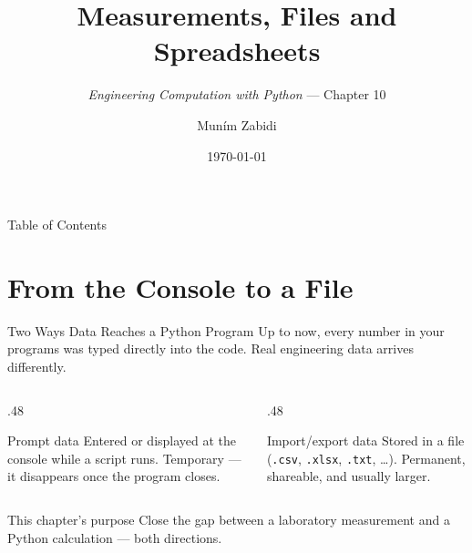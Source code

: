 \documentclass[9pt,aspectratio=169,xcolor=table]{beamer}
\title{Measurements, Files and Spreadsheets}
\subtitle{\emph{Engineering Computation with Python} --- Chapter 10}
\author{Mun\'{i}m Zabidi}
\institute{\color{primary}Faculty of Electrical Engineering, Universiti Teknologi Malaysia}
\date{\today}
\begin{document}
\titlepage

\begin{frame}{Table of Contents}
    \tableofcontents
\end{frame}

\section{From the Console to a File}

\begin{frame}{Two Ways Data Reaches a Python Program}
    \leavevmode
    Up to now, every number in your programs was typed directly into the
    code. Real engineering data arrives differently.

    \vspace{3mm}
    \begin{columns}[t]
        \begin{column}{.48\textwidth}
            \begin{block}{Prompt data}
                \small Entered or displayed at the console while a
                script runs. Temporary --- it disappears once the
                program closes.
            \end{block}
        \end{column}
        \begin{column}{.48\textwidth}
            \begin{block}{Import/export data}
                \small Stored in a file (\texttt{.csv}, \texttt{.xlsx},
                \texttt{.txt}, \ldots). Permanent, shareable, and
                usually larger.
            \end{block}
        \end{column}
    \end{columns}

    \vspace{4mm}
    \begin{alertblock}{This chapter's purpose}
        Close the gap between a laboratory measurement and a Python
        calculation --- both directions.
    \end{alertblock}
\end{frame}
\end{document}
